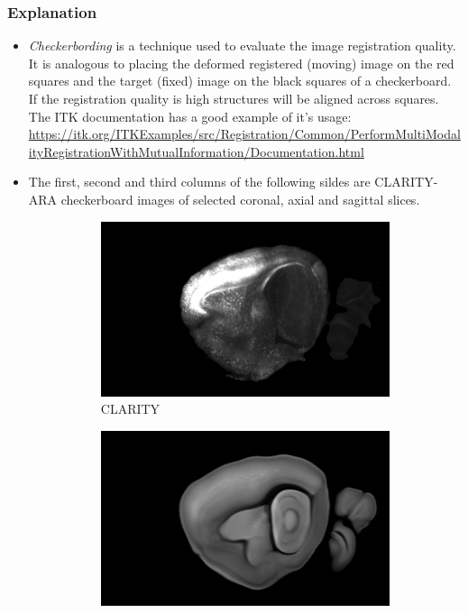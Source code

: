 \documentclass[8pt]{beamer}
\begin{document}
 \begin{frame}
  \frametitle{Explanation}
  \begin{itemize}
   \item \emph{Checkerbording} is a technique used to evaluate the image registration quality.
    It is analogous to placing the deformed registered (moving) image on the red squares and the target (fixed) image on the black squares of a checkerboard.
    If the registration quality is high structures will be aligned across squares.
    The ITK documentation has a good example of it's usage: \\ 
    \tiny{\url{https://itk.org/ITKExamples/src/Registration/Common/PerformMultiModalityRegistrationWithMutualInformation/Documentation.html}}

   \item The first, second and third columns of the following sildes are CLARITY-ARA checkerboard images of selected coronal, axial and sagittal slices.
    \begin{figure}
     \begin{subfigure}{0.30\textwidth}
      \includegraphics[width=\textwidth]{clarity.png}
      \caption{CLARITY}
     \end{subfigure}
     \begin{subfigure}{0.30\textwidth}
      \includegraphics[width=\textwidth]{ara.png}

\end{subfigure}
\end{figure}
\end{itemize}
\end{frame}
\end{document}
